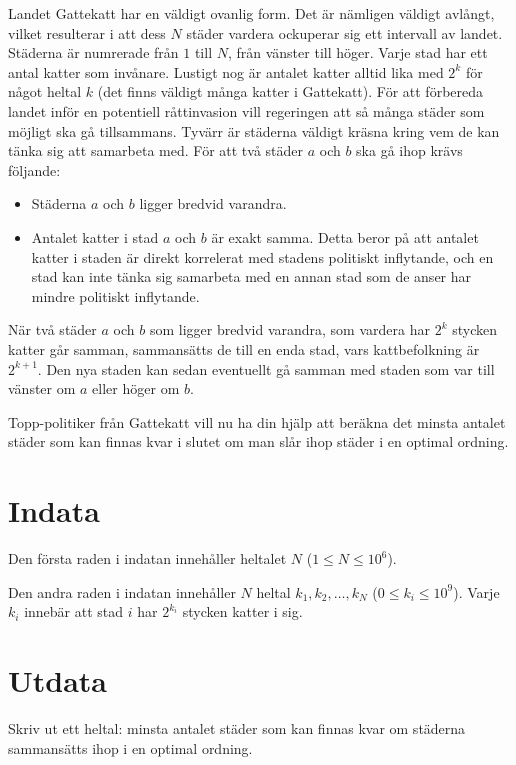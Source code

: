 \noindent
Landet Gattekatt har en väldigt ovanlig form. Det är nämligen väldigt avlångt, vilket resulterar i att dess $N$ städer
vardera ockuperar sig ett intervall av landet.
Städerna är numrerade från $1$ till $N$, från vänster till höger. Varje stad har ett antal katter som invånare. Lustigt nog är
antalet katter alltid lika med $2^k$ för något heltal $k$ (det finns väldigt många katter i Gattekatt).
För att förbereda landet inför en potentiell råttinvasion vill regeringen att så många städer som möjligt ska gå tillsammans.
Tyvärr är städerna väldigt kräsna kring vem de kan tänka sig att samarbeta med. För att två städer $a$ och $b$ ska gå ihop krävs följande:
\begin{itemize}
  \item Städerna $a$ och $b$ ligger bredvid varandra. 
  \item Antalet katter i stad $a$ och $b$ är exakt samma. Detta beror på att antalet katter i staden är direkt korrelerat med stadens
  politiskt inflytande, och en stad kan inte tänka sig samarbeta med en annan stad som de anser har mindre politiskt inflytande.
\end{itemize}

När två städer $a$ och $b$ som ligger bredvid varandra, som vardera har $2^k$ stycken katter går samman, sammansätts de till en enda stad, vars kattbefolkning är $2^{k+1}$.
Den nya staden kan sedan eventuellt gå samman med staden som var till vänster om $a$ eller höger om $b$.

Topp-politiker från Gattekatt vill nu ha din hjälp att beräkna det minsta antalet städer som kan finnas kvar i slutet om man
slår ihop städer i en optimal ordning. 


\section*{Indata}
Den första raden i indatan innehåller heltalet $N$ ($1 \leq N \leq 10^6$).

Den andra raden i indatan innehåller $N$ heltal $k_1,k_2,\dots,k_N$ ($0 \leq k_i \leq 10^9$).
Varje $k_i$ innebär att stad $i$ har $2^{k_i}$ stycken katter i sig. 

\section*{Utdata}
Skriv ut ett heltal: minsta antalet städer som kan finnas kvar om städerna sammansätts ihop i en optimal ordning.

